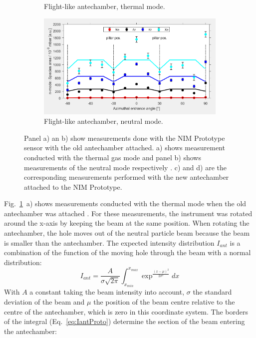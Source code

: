 \begin{figure}[h!]
\begin{subfigure}[b]{.5\textwidth}
			\caption{Flight-like antechamber, thermal mode.}
		\end{subfigure}
		\begin{subfigure}[b]{.5\textwidth}
			\centering
			\includegraphics[width=\textwidth]{Experiments/newAnte_NMode.png}
			\caption{Flight-like antechamber, neutral mode.}
		\end{subfigure}
		\caption{Panel a) an b) show measurements done with the NIM Prototype sensor with the old antechamber attached. a) shows measurement conducted with the thermal gas mode and panel b) shows measurements of the neutral mode respectively \cite{Meyer_2017_ante}. c) and d) are the corresponding measurements performed with the new antechamber attached to the NIM Prototype.}
		\label{fig:AnteMeasData}
	\end{figure}
	Fig.~\ref{fig:AnteMeasData}~a) shows measurements conducted with the thermal mode when the old antechamber was attached \cite{Meyer_2017_ante}. For these measurements, the instrument was rotated around the x-axis by keeping the beam at the same position. When rotating the antechamber, the hole moves out of the neutral particle beam because the beam is smaller than the antechamber. The expected intensity distribution $I_{ant}$ is a combination of the function of the moving hole through the beam with a normal distribution:
	\begin{equation}
		I_{ant} = \frac{A}{\sigma\sqrt{2\pi}}\int_{x_{min}}^{x_{max}} \exp^{\frac{(x-\mu)^2}{2\sigma^2}} dx
		\label{eq:IantProto}
	\end{equation}
	With $A$ a constant taking the beam intensity into account, $\sigma$ the standard deviation of the beam and $\mu$ the position of the beam centre relative to the centre of the antechamber, which is zero in this coordinate system. The borders of the integral (Eq.~\eqref{eq:IantProto}) determine the section of the beam entering the antechamber:
